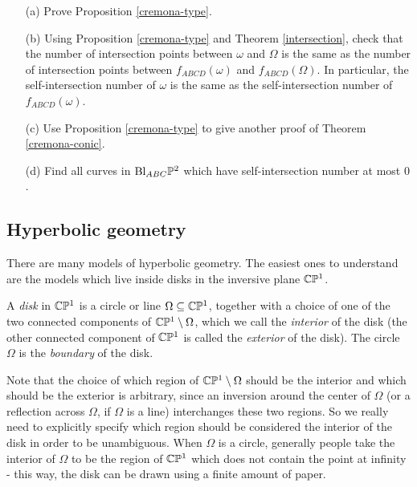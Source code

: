 \begin{exer}
\begin{itemize}
\item[(a)] Prove Proposition \ref{cremona-type}.

\item[(b)] Using Proposition \ref{cremona-type} and Theorem \ref{intersection}, check that the number of intersection points between $\omega$ and $\Omega$ is the same as the number of intersection points between $f_{ABCD}(\omega)$ and $f_{ABCD}(\Omega)$. In particular, the self-intersection number of $\omega$ is the same as the self-intersection number of $f_{ABCD}(\omega)$.

\item[(c)] Use Proposition \ref{cremona-type} to give another proof of Theorem \ref{cremona-conic}.

\item[(d)] Find all curves in $\text{\rm Bl}_{ABC}\mathbb{P}^2$ which have self-intersection number at most $0$.
\end{itemize}
\end{exer}




\subsection{Hyperbolic geometry}

There are many models of hyperbolic geometry. The easiest ones to understand are the models which live inside disks in the inversive plane $\mathbb{C}\mathbb{P}^1$.

\begin{defn} A \emph{disk} in $\mathbb{C}\mathbb{P}^1$ is a circle or line $\Omega \subseteq \mathbb{C}\mathbb{P}^1$, together with a choice of one of the two connected components of $\mathbb{C}\mathbb{P}^1 \setminus \Omega$, which we call the \emph{interior} of the disk (the other connected component of $\mathbb{C}\mathbb{P}^1$ is called the \emph{exterior} of the disk). The circle $\Omega$ is the \emph{boundary} of the disk.
\end{defn}

Note that the choice of which region of $\mathbb{C}\mathbb{P}^1\setminus\Omega$ should be the interior and which should be the exterior is arbitrary, since an inversion around the center of $\Omega$ (or a reflection across $\Omega$, if $\Omega$ is a line) interchanges these two regions. So we really need to explicitly specify which region should be considered the interior of the disk in order to be unambiguous. When $\Omega$ is a circle, generally people take the interior of $\Omega$ to be the region of $\mathbb{C}\mathbb{P}^1$ which does not contain the point at infinity - this way, the disk can be drawn using a finite amount of paper.

